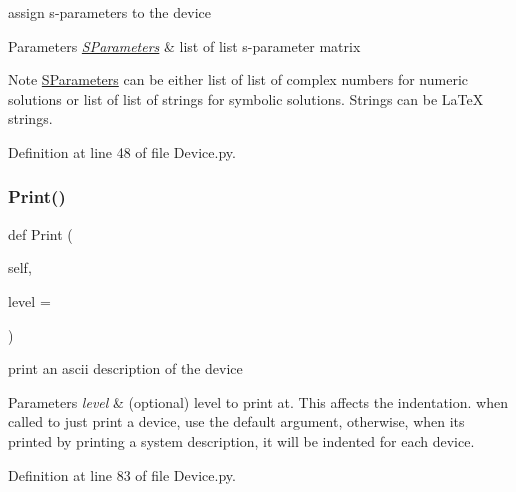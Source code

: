 assign s-\/parameters to the device 


\begin{DoxyParams}{Parameters}
{\em \hyperlink{namespaceSignalIntegrity_1_1SParameters}{S\+Parameters}} & list of list s-\/parameter matrix \\
\hline
\end{DoxyParams}
\begin{DoxyNote}{Note}
\hyperlink{namespaceSignalIntegrity_1_1SParameters}{S\+Parameters} can be either list of list of complex numbers for numeric solutions or list of list of strings for symbolic solutions. Strings can be La\+TeX strings. 
\end{DoxyNote}


Definition at line 48 of file Device.\+py.

\mbox{\label{classSignalIntegrity_1_1SystemDescriptions_1_1Device_1_1Device_a891ce4dff358dfe4f73c3c0e269bcffd}} 
\subsubsection{\texorpdfstring{Print()}{Print()}}
{\footnotesize\ttfamily def Print (\begin{DoxyParamCaption}\item[{}]{self,  }\item[{}]{level = {} }\end{DoxyParamCaption})}



print an ascii description of the device 


\begin{DoxyParams}{Parameters}
{\em level} & (optional) level to print at. This affects the indentation. when called to just print a device, use the default argument, otherwise, when it\textquotesingle{}s printed by printing a system description, it will be indented for each device. \\
\hline
\end{DoxyParams}


Definition at line 83 of file Device.\+py.

